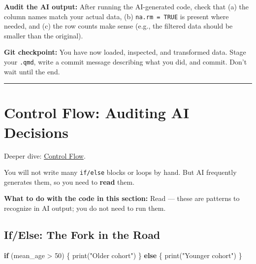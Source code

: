 \documentclass[
  letterpaper,
  DIV=11,
  numbers=noendperiod,
  oneside]{scrreprt}
\newenvironment{Shaded}{\begin{snugshade}}{\end{snugshade}}
\newcommand{\ControlFlowTok}[1]{\textcolor[rgb]{0.00,0.23,0.31}{\textbf{#1}}}
\newcommand{\DecValTok}[1]{\textcolor[rgb]{0.68,0.00,0.00}{#1}}
\newcommand{\FunctionTok}[1]{\textcolor[rgb]{0.28,0.35,0.67}{#1}}
\newcommand{\NormalTok}[1]{\textcolor[rgb]{0.00,0.23,0.31}{#1}}
\newcommand{\SpecialCharTok}[1]{\textcolor[rgb]{0.37,0.37,0.37}{#1}}
\newcommand{\StringTok}[1]{\textcolor[rgb]{0.13,0.47,0.30}{#1}}
\begin{document}
\begin{tcolorbox}[enhanced jigsaw, title=\textcolor{quarto-callout-tip-color}{\faLightbulb}\hspace{0.5em}{Tip}, arc=.35mm, toptitle=1mm, colframe=quarto-callout-tip-color-frame, toprule=.15mm, leftrule=.75mm, bottomtitle=1mm, opacityback=0, bottomrule=.15mm, coltitle=black, breakable, opacitybacktitle=0.6, titlerule=0mm, colback=white, left=2mm, colbacktitle=quarto-callout-tip-color!10!white, rightrule=.15mm]

\textbf{Audit the AI output:} After running the AI-generated code, check
that (a) the column names match your actual data, (b)
\texttt{na.rm\ =\ TRUE} is present where needed, and (c) the row counts
make sense (e.g., the filtered data should be smaller than the
original).

\end{tcolorbox}

\textbf{Git checkpoint:} You have now loaded, inspected, and transformed
data. Stage your \texttt{.qmd}, write a commit message describing what
you did, and commit. Don't wait until the end.

\begin{center}\rule{0.5\linewidth}{0.5pt}\end{center}

\section*{Control Flow: Auditing AI
Decisions}\label{control-flow-auditing-ai-decisions}


Deeper dive: \href{r04-control-flow.qmd}{Control Flow}.

You will not write many \texttt{if/else} blocks or loops by hand. But AI
frequently generates them, so you need to \textbf{read} them.

\textbf{What to do with the code in this section:} Read --- these are
patterns to recognize in AI output; you do not need to run them.

\subsection*{If/Else: The Fork in the
Road}\label{ifelse-the-fork-in-the-road}

\begin{Shaded}
\begin{Highlighting}[numbers=left,,]
\ControlFlowTok{if}\NormalTok{ (mean\_age }\SpecialCharTok{\textgreater{}} \DecValTok{50}\NormalTok{) \{}
  \FunctionTok{print}\NormalTok{(}\StringTok{"Older cohort"}\NormalTok{)}
\NormalTok{\} }\ControlFlowTok{else}\NormalTok{ \{}
  \FunctionTok{print}\NormalTok{(}\StringTok{"Younger cohort"}\NormalTok{)}
\NormalTok{\}}
\end{Highlighting}
\end{Shaded}
\end{document}
